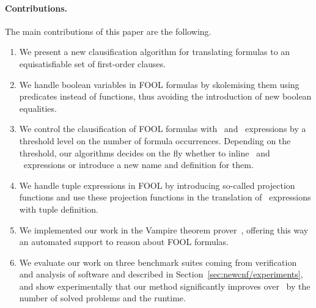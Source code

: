 
\paragraph{Contributions.} The main contributions of this paper are the following.
\begin{enumerate}
  \item We present a new clausification algorithm for translating \folb{} formulas to an equisatisfiable set of first-order clauses. 
  \item We handle boolean variables in FOOL formulas by skolemising them using \skolem{} predicates instead of \skolem{} functions, thus avoiding the introduction of new boolean equalities. 
  \item We control the clausification of FOOL formulas with \ITE\ and \LETIN\ expressions by a threshold level on the number of formula occurrences. Depending on the threshold, our algorithms decides on the fly whether to inline \ITE\ and \LETIN\ expressions or introduce a new name and definition for them. 
\item We handle tuple expressions in FOOL by introducing so-called projection functions  and use these projection functions in the translation of \LETIN\ expressions with tuple definition. 
  \item We implemented our work in the Vampire theorem prover~\cite{Vampire13}, 
  offering this way an automated support to reason about FOOL formulas. 
  \item We evaluate our work on three benchmark suites coming from verification
    and analysis of software and described in
    Section~\ref{sec:newcnf/experiments}, and show experimentally that our method
    significantly improves over~\cite{VampireAndFOOL} by the number of solved problems and the runtime.
\end{enumerate}